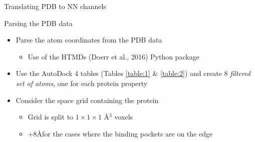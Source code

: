 \documentclass{beamer}
\begin{document}
\begin{frame}{Translating PDB to NN channels}
  \begin{block}{Parsing the PDB data}
    \begin{itemize}
      \item Parse the atom coordinates from the PDB data
      \begin{itemize}
        \item Use of the HTMDs (Doerr et al., 2016) Python package
      \end{itemize}
      \item Use the AutoDock 4 tables (Tables \ref{table:1} \& \ref{table:2}) and create 8 \emph{filtered set of atoms}, one for each protein property
      \item Consider the space grid containing the protein
      \begin{itemize}
        \item Grid is split to $1 \times 1 \times 1 $ \AA$^3$ voxels
        \item $+8$\AA \;for the cases where the binding pockets are on the edge
      \end{itemize}
    \end{itemize}
  \end{block}
\end{frame}
\end{document}
